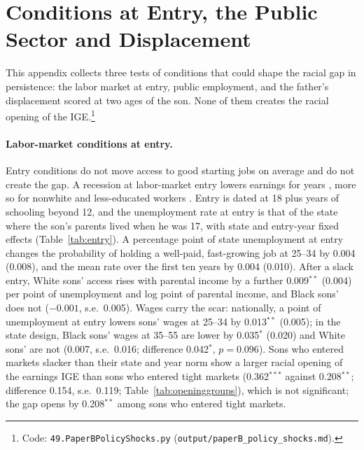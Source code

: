 \section{Conditions at Entry, the Public Sector and Displacement}\label{app:entry}

This appendix collects three tests of conditions that could shape the racial gap in persistence: the labor market at
entry, public employment, and the father's displacement scored at two ages of the son. None of them creates the
racial opening of the IGE.\footnote{Code: \texttt{49.PaperBPolicyShocks.py} (\texttt{output/paperB\_policy\_shocks.md}).}

\paragraph{Labor-market conditions at entry.} Entry conditions do not move access to good starting jobs on average and
do not create the gap. A recession at labor-market entry lowers earnings for years \citep{kahn2010long,
oreopoulos2012short}, more so for nonwhite and less-educated workers \citep{schwandt2019unlucky}. Entry is dated at 18
plus years of schooling beyond 12, and the unemployment rate at entry is that of the state where the son's parents
lived when he was 17, with state and entry-year fixed effects (Table~\ref{tab:entry}). A percentage point of state
unemployment at entry changes the probability of holding a well-paid, fast-growing job at 25--34 by 0.004 (0.008), and
the mean rate over the first ten years by 0.004 (0.010). After a slack entry, White sons' access rises with parental
income by a further 0.009$^{**}$ (0.004) per point of unemployment and log point of parental income, and Black sons'
does not ($-0.001$, s.e.\ 0.005). Wages carry the scar: nationally, a point of unemployment at entry lowers sons' wages
at 25--34 by 0.013$^{**}$ (0.005); in the state design, Black sons' wages at 35--55 are lower by 0.035$^{*}$ (0.020) and
White sons' are not (0.007, s.e.\ 0.016; difference 0.042$^{*}$, $p=0.096$). Sons who entered markets slacker than
their state and year norm show a larger racial opening of the earnings IGE than sons who entered tight markets
(0.362$^{***}$ against 0.208$^{**}$; difference 0.154, s.e.\ 0.119; Table~\ref{tab:openinggroups}), which is not
significant; the gap opens by 0.208$^{**}$ among sons who entered tight markets.



